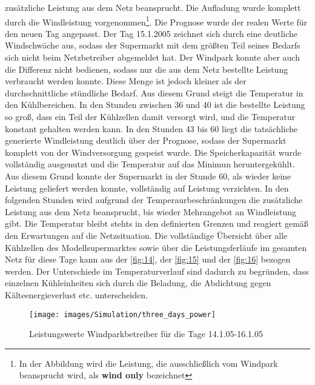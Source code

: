 zus\"atzliche Leistung aus dem Netz beansprucht.  Die Aufladung wurde komplett
durch die Windleistung vorgenommen\footnote{ In der Abbildung wird die Leistung,
die ausschlie\ss lich vom Windpark beansprucht wird, als \textbf{wind only}
bezeichnet}. Die Prognose wurde der realen Werte f\"ur den neuen Tag angepasst.
Der Tag 15.1.2005 zeichnet sich durch eine deutliche Windschw\"ache aus, sodass
der Supermarkt mit dem gr\"o\ss ten Teil seines Bedarfs sich nicht beim
Netzbetreiber abgemeldet hat. Der Windpark konnte aber auch die Differenz nicht
bedienen, sodass nur die aus dem Netz bestellte Leistung verbraucht werden
konnte. Diese Menge ist jedoch kleiner als der durchschnittliche st\"undliche
Bedarf.  Aus diesem Grund steigt die Temperatur in den K\"uhlbereichen.  In den
Stunden zwischen 36 und 40 ist die bestellte Leistung so gro\ss ,$ $ dass ein
Teil der K\"uhlzellen damit versorgt wird, und die Temperatur konstant gehalten
werden kann. In den Stunden 43 bis 60 liegt die tats\"achliche generierte
Windleistung deutlich \"uber der Prognose, sodass der Supermarkt komplett von
der Windversorgung gespeist wurde. Die Speicherkapazit\"at wurde vollst\"andig
ausgenutzt und die Temperatur auf das Minimun heruntergek\"uhlt. Aus diesem
Grund konnte der Supermarkt in der Stunde 60, als wieder keine Leistung
geliefert werden konnte, vollst\"andig auf Leistung verzichten. In den folgenden
Stunden wird aufgrund der Temperaurbeschr\"ankungen die zus\"atzliche Leistung
aus dem Netz beansprucht, bis wieder Mehrangebot an Windleistung gibt. Die
Temperatur bleibt stehts in den definierten Grenzen und reagiert gem\"a\ss $ $
den Erwartungen auf die Netzsituation. Die vollst\"andige \"Ubersicht \"uber
alle K\"uhlzellen des Modellsupermarktes sowie \"uber die Leistungsferl\"aufe im
gesamten Netz f\"ur diese Tage kann aus der \cref{fig:14}, der \cref{fig:15} und
der \cref{fig:16} bezogen werden. Der Unterschiede im Temperaturverlauf sind
dadurch zu begr\"unden, dass einzelnen K\"uhleinheiten sich durch die Beladung,
die Abdichtung gegen K\"alteenergieverlust etc. unterscheiden.

\begin{figure}[h] \begin{center}
\texttt{[image: images/Simulation/three\_days\_power]} \end{center}
\vspace{-25pt} \caption{Leistungswerte Windparkbetreiber f\"ur die Tage
14.1.05-16.1.05} \label{fig:threep} \end{figure}

